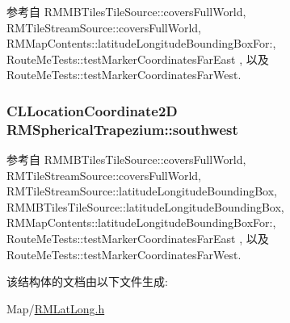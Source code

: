 参考自 R\-M\-M\-B\-Tiles\-Tile\-Source\-::covers\-Full\-World, R\-M\-Tile\-Stream\-Source\-::covers\-Full\-World, R\-M\-Map\-Contents\-::latitude\-Longitude\-Bounding\-Box\-For\-:, Route\-Me\-Tests\-::test\-Marker\-Coordinates\-Far\-East , 以及 Route\-Me\-Tests\-::test\-Marker\-Coordinates\-Far\-West.

\hypertarget{struct_r_m_spherical_trapezium_a65544ba36cbd0ae7f67634a6d55751ef}{
\subsubsection[{southwest}]{\setlength{\rightskip}{0pt plus 5cm}C\-L\-Location\-Coordinate2\-D R\-M\-Spherical\-Trapezium\-::southwest}}\label{struct_r_m_spherical_trapezium_a65544ba36cbd0ae7f67634a6d55751ef}


参考自 R\-M\-M\-B\-Tiles\-Tile\-Source\-::covers\-Full\-World, R\-M\-Tile\-Stream\-Source\-::covers\-Full\-World, R\-M\-Tile\-Stream\-Source\-::latitude\-Longitude\-Bounding\-Box, R\-M\-M\-B\-Tiles\-Tile\-Source\-::latitude\-Longitude\-Bounding\-Box, R\-M\-Map\-Contents\-::latitude\-Longitude\-Bounding\-Box\-For\-:, Route\-Me\-Tests\-::test\-Marker\-Coordinates\-Far\-East , 以及 Route\-Me\-Tests\-::test\-Marker\-Coordinates\-Far\-West.



该结构体的文档由以下文件生成\-:\begin{DoxyCompactItemize}
\item 
Map/\hyperlink{_r_m_lat_long_8h}{R\-M\-Lat\-Long.\-h}\end{DoxyCompactItemize}
